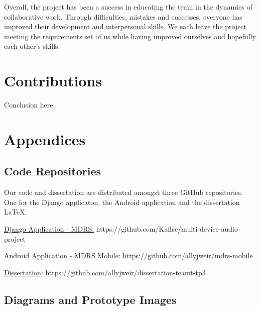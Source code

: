 \documentclass{l3proj}
\begin{document}
Overall, the project has been a success in educating the team in the dynamics of collaborative work. Through difficulties, mistakes and successes, everyone has improved their development and interpersonal skills. We each leave the project meeting the requirements set of us while having improved ourselves and hopefully each other's skills.

\section{Contributions}

Conclusion here

\section{Appendices}
\subsection{Code Repositories}
Our code and dissertation are distributed amongst three GitHub repositories. One for the Django applicaton, the Android application and the dissertation LaTeX.

\href{https://github.com/Kaffse/multi-device-audio-project}{Django Application - MDRS:}
https://github.com/Kaffse/multi-device-audio-project

\href{https://github.com/allyjweir/mdrs-mobile}{Android Application - MDRS Mobile:}
https://github.com/allyjweir/mdrs-mobile

\href{https://github.com/allyjweir/dissertation-teamt-tp3}{Dissertation:}
https://github.com/allyjweir/dissertation-teamt-tp3

\subsection{Diagrams and Prototype Images}



\printglossaries
\end{document}
